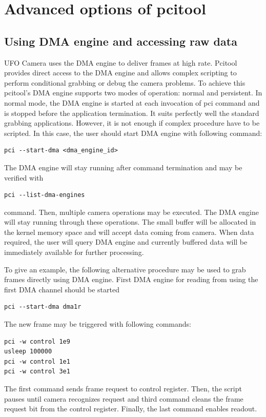 


\section{Advanced options of pcitool}

\subsection{Using DMA engine and accessing raw data}

UFO Camera uses the DMA engine to deliver frames at high rate. Pcitool provides direct access to the DMA engine and allows complex scripting to perform conditional grabbing or debug the camera problems. To achieve this pcitool's DMA engine supports two modes of operation: normal and persistent. In normal mode, the DMA engine is started at each invocation of pci command and is stopped before the application termination. It suits perfectly well the standard grabbing applications. However, it is not enough if complex procedure have to be scripted. In this case, the user should start DMA engine with following command:
\begin{verbatim}
pci --start-dma <dma_engine_id>
\end{verbatim}

The DMA engine will stay running after command termination and may be verified with 
\begin{verbatim}
pci --list-dma-engines
\end{verbatim}
command. Then, multiple camera operations may be executed. The DMA engine will stay running through these operations. The small buffer will be allocated in the kernel memory space and will accept data coming from camera. When data required, the user will query DMA engine and currently buffered data will be immediately available for further processing. 

To give an example, the following alternative procedure may be used to grab frames directly using DMA engine. First DMA engine for reading from using the first DMA channel should be started
\begin{verbatim}
pci --start-dma dma1r
\end{verbatim}

The new frame may be triggered with following commands:
\begin{verbatim}
pci -w control 1e9
usleep 100000
pci -w control 1e1
pci -w control 3e1
\end{verbatim}
The first command sends frame request to control register. Then, the script pauses until camera recognizes request and third command cleans the frame request bit from the control register. Finally, the last command enables readout.

